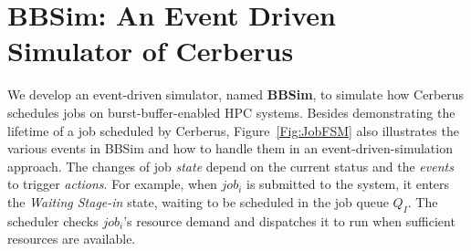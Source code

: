 

\section{BBSim: An Event Driven Simulator of Cerberus}
\label{Sec:Simulation}

We develop an event-driven simulator, named \textbf{BBSim},
to simulate how Cerberus schedules jobs on burst-buffer-enabled HPC systems.
Besides demonstrating the lifetime of a job scheduled by Cerberus,
Figure~\ref{Fig:JobFSM} also illustrates the various events in BBSim and how to handle
them in an event-driven-simulation approach.
The changes of job \textit{state} depend on the current status and the \textit{events} to trigger \textit{actions}.
For example, when $job_i$ is submitted to the system,
it enters the \textit{Waiting Stage-in} state,
waiting to be scheduled in the job queue $Q_I$. 
The scheduler checks $job_i$'s resource demand and
dispatches it to run when sufficient resources are available.

